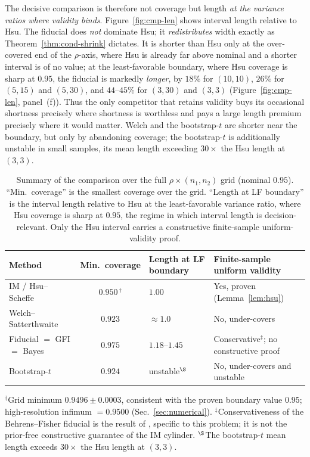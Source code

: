 \documentclass[12pt]{article}
\begin{document}
The decisive comparison is therefore not coverage but length \emph{at the
variance ratios where validity binds}.  Figure~\ref{fig:cmp-len} shows interval
length relative to Hsu.  The fiducial does \emph{not} dominate Hsu; it
\emph{redistributes} width exactly as Theorem~\ref{thm:cond-shrink} dictates.  It
is shorter than Hsu only at the over-covered end of the \(\rho\)-axis, where Hsu
is already far above nominal and a shorter interval is of no value; at the
least-favorable boundary, where Hsu coverage is sharp at \(0.95\), the fiducial
is markedly \emph{longer}, by \(18\%\) for \((10,10)\), \(26\%\) for
\((5,15)\) and \((5,30)\), and \(44\)--\(45\%\) for \((3,30)\) and \((3,3)\)
(Figure~\ref{fig:cmp-len}, panel~(f)).  Thus the only competitor that retains
validity buys its occasional shortness precisely where shortness is worthless and
pays a large length premium precisely where it would matter.  Welch and the
bootstrap-\(t\) are shorter near the boundary, but only by abandoning coverage;
the bootstrap-\(t\) is additionally unstable in small samples, its mean length
exceeding \(30\times\) the Hsu length at \((3,3)\).

\begin{table}[htbp]
\centering
\caption{Summary of the comparison over the full \(\rho\times(n_1,n_2)\) grid
(nominal \(0.95\)).  ``Min.\ coverage'' is the smallest coverage over the grid.
``Length at LF boundary'' is the interval length relative to Hsu at the
least-favorable variance ratio, where Hsu coverage is sharp at \(0.95\), the
regime in which interval length is decision-relevant.  Only the Hsu interval
carries a constructive finite-sample uniform-validity proof.}
\label{tab:cmp}
{\small
\begin{tabularx}{\textwidth}{@{}l c >{\centering\arraybackslash}p{2.3cm} >{\raggedright\arraybackslash}X@{}}
\hline
Method & Min.\ coverage & Length at LF boundary & Finite-sample uniform validity \\
\hline
IM / Hsu--Scheffe              & \(0.950\)\,\(^{\dagger}\) & \(1.00\) & Yes, proven (Lemma~\ref{lem:hsu}) \\
Welch--Satterthwaite          & \(0.923\) & \(\approx 1.0\) & No, under-covers \\
Fiducial \(=\) GFI \(=\) Bayes & \(0.975\) & \(1.18\)--\(1.45\) & Conservative\(^{\ddagger}\); no constructive proof \\
Bootstrap-\(t\)                & \(0.924\) & unstable\(^{\S}\) & No, under-covers and unstable \\
\hline
\end{tabularx}
}

\smallskip
{\footnotesize \(^{\dagger}\)Grid minimum \(0.9496\pm0.0003\), consistent with
the proven boundary value \(0.95\); high-resolution infimum \(=0.9500\)
(Sec.~\ref{sec:numerical}).  \(^{\ddagger}\)Conservativeness of the
Behrens--Fisher fiducial is the result of \citet{Robinson1976}, specific to this
problem; it is not the prior-free constructive guarantee of the IM cylinder.
\(^{\S}\)The bootstrap-\(t\) mean length exceeds \(30\times\) the Hsu length at
\((3,3)\).}
\end{table}
\end{document}
